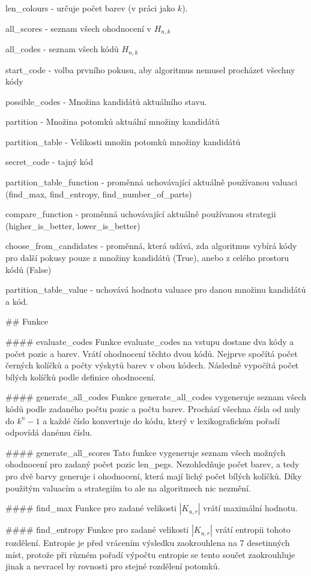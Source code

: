 \documentclass[12pt,a4paper]{article}
\begin{document}
len_colours - určuje počet barev (v práci jako $k$).

all_scores - seznam všech ohodnocení v $H_{n,k}$

all_codes - seznam všech kódů $H_{n,k}$

start_code - volba prvního pokusu, aby algoritmus nemusel procházet všechny kódy

possible_codes - Množina kandidátů aktuálního stavu.

partition - Množina potomků aktuální množiny kandidátů

partition_table - Velikosti množin potomků množiny kandidátů

secret_code - tajný kód

partition_table_function - proměnná uchovávající aktuálně používanou valuaci (find_max, find_entropy, find_number_of_parts)

compare_function - proměnná uchovávající aktuálně používanou strategii (higher_is_better, lower_is_better)

choose_from_candidates - proměnná, která udává, zda algoritmus vybírá kódy pro další pokusy pouze z množiny kandidátů (True), anebo z celého prostoru kódů (False)

partition_table_value - uchovává hodnotu valuace pro danou množinu kandidátů a kód.


## Funkce

#### evaluate_codes
Funkce evaluate_codes na vstupu dostane dva kódy a počet pozic a barev. Vrátí ohodnocení těchto dvou kódů. Nejprve spočítá počet černých kolíčků a počty výskytů barev v obou kódech. Následně vypočítá počet bílých kolíčků podle definice ohodnocení. 

#### generate_all_codes
Funkce generate_all_codes vygeneruje seznam všech kódů podle zadaného počtu pozic a počtu barev. Prochází všechna čísla od nuly do $k^n - 1$ a každé číslo konvertuje do kódu, který v lexikografickém pořadí odpovídá danému číslu. 

#### generate_all_scores
Tato funkce vygeneruje seznam všech možných ohodnocení pro zadaný počet pozic len_pegs. Nezohledňuje počet barev, a tedy pro dvě barvy generuje i ohodnocení, která mají lichý počet bílých kolíčků. Díky použitým valuacím a strategiím to ale na algoritmech nic nezmění.

#### find_max
Funkce pro zadané velikosti $|K_{u,r}|$ vrátí maximální hodnotu. 

#### find_entropy
Funkce pro zadané velikosti $|K_{u,r}|$ vrátí entropii tohoto rozdělení. Entropie je před vrácením výsledku zaokrouhlena na 7 desetinných míst, protože při různém pořadí výpočtu entropie se tento součet zaokrouhluje jinak a nevracel by rovnosti pro stejné rozdělení potomků.
\end{document}
